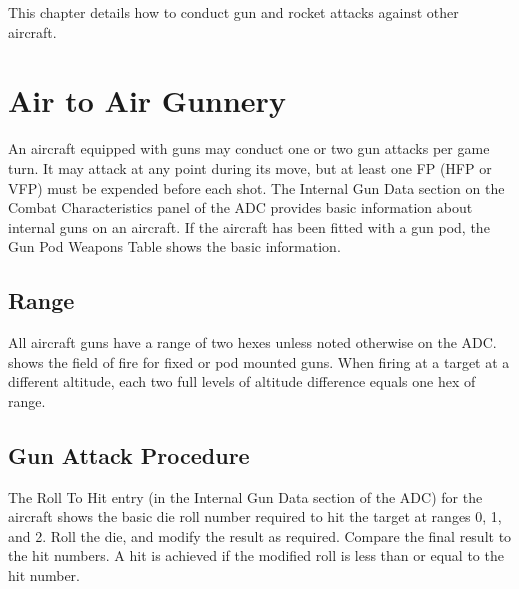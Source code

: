 
\label{rule:air-to-air-gun-and-rocket-combat}

This chapter details how to conduct gun and rocket attacks against other aircraft.

\section{Air to Air Gunnery}
\label{rule:air-to-air-gun-combat}

An aircraft equipped with guns may conduct one or two gun attacks per game turn. It may attack at any point during its move, but at least one FP (HFP or VFP) must be expended before each shot. The Internal Gun Data section on the Combat Characteristics panel of the ADC provides basic information about internal guns on an aircraft. If the aircraft has been fitted with a gun pod, the Gun Pod Weapons Table shows the basic information.

\subsection{Range}
All aircraft guns have a range of two hexes unless noted otherwise on the ADC.  shows the field of fire for fixed or pod mounted guns. When firing at a target at a different altitude, each two full levels of altitude difference equals one hex of range.


\subsection{Gun Attack Procedure}

The Roll To Hit entry (in the Internal Gun Data section of the ADC) for the aircraft shows the basic die roll number required to hit the target at ranges 0, 1, and 2. Roll the die, and modify the result as required. Compare the final result to the hit numbers. A hit is achieved if the modified roll is less than or equal to the hit number.

